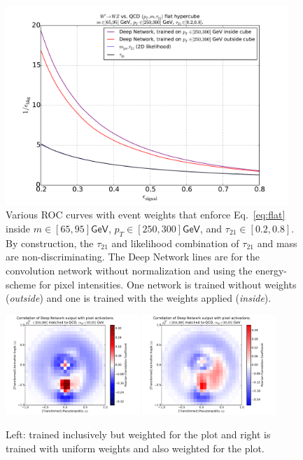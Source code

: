 \begin{figure}[htbp]
  \centering
  \includegraphics[width=0.95\textwidth]{figures/roc-cube-inside.pdf}
  \caption{Various ROC curves with event weights that enforce Eq.~\ref{eq:flat} inside $m\in[65, 95]\mathsf{GeV}$,  $p_T\in[250, 300]\mathsf{GeV}$, and  $\tau_{21}\in[0.2, 0.8]$.  By construction, the $\tau_{21}$ and likelihood combination of $\tau_{21}$ and mass are non-discriminating.  The Deep Network lines are for the convolution network without normalization and using the energy-scheme for pixel intensities.  One network is trained without weights ({\it outside}) and one is trained with the weights applied ({\it inside}).}
  \label{fig:rocCube}
\end{figure}


\begin{figure}[htbp]
  \centering
  \includegraphics[width=0.45\textwidth]{figures/hypercube-pixel-activations-corr.pdf} \includegraphics[width=0.45\textwidth]{figures/ahypercube-pixel-activations-corr.pdf}
  \caption{Left: trained inclusively but weighted for the plot and right is trained with uniform weights and also weighted for the plot.}
  \label{fig:images_hyper}
\end{figure}

